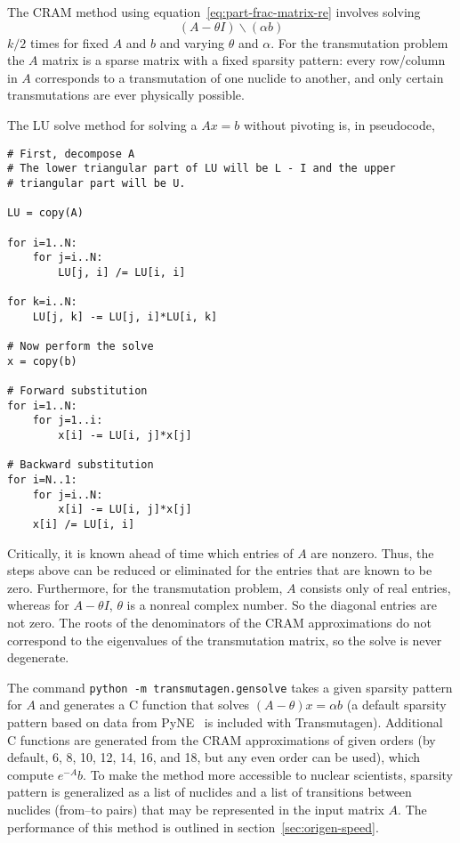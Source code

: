 The CRAM method using equation~\ref{eq:part-frac-matrix-re} involves solving
\begin{equation}
 (A - \theta I)\backslash(\alpha b)
\end{equation}
$k/2$ times for fixed $A$ and $b$ and varying $\theta$ and $\alpha$. For the
transmutation problem the $A$ matrix is a sparse matrix with a fixed sparsity
pattern: every row/column in $A$ corresponds to a transmutation of one nuclide
to another, and only certain transmutations are ever physically possible.

The LU solve method for solving a $Ax=b$ without pivoting is, in pseudocode,

\begin{verbatim}
# First, decompose A
# The lower triangular part of LU will be L - I and the upper
# triangular part will be U.

LU = copy(A)

for i=1..N:
    for j=i..N:
        LU[j, i] /= LU[i, i]

for k=i..N:
    LU[j, k] -= LU[j, i]*LU[i, k]

# Now perform the solve
x = copy(b)

# Forward substitution
for i=1..N:
    for j=1..i:
        x[i] -= LU[i, j]*x[j]

# Backward substitution
for i=N..1:
    for j=i..N:
        x[i] -= LU[i, j]*x[j]
    x[i] /= LU[i, i]
\end{verbatim}

Critically, it is known ahead of time which entries of $A$ are nonzero. Thus,
the steps above can be reduced or eliminated for the entries that are known to
be zero. Furthermore, for the transmutation problem, $A$ consists only of real
entries, whereas for $A - \theta I$, $\theta$ is a nonreal complex number. So
the diagonal entries are not zero. The roots of the denominators of the CRAM
approximations do not correspond to the eigenvalues of the transmutation
matrix, so the solve is never degenerate.

The command \texttt{python -m transmutagen.gensolve} takes a given sparsity
pattern for $A$ and generates a C function that solves
$(A - \theta)x =\alpha b$ (a default sparsity pattern based on data from
PyNE~\cite{ationneeded} is included with Transmutagen). Additional C functions
are generated from the CRAM approximations of given orders (by default, 6, 8,
10, 12, 14, 16, and 18, but any even order can be used), which compute
$e^{-A}b$. To make the method more accessible to nuclear scientists, sparsity
pattern is generalized as a list of nuclides and a list of transitions between
nuclides (from--to pairs) that may be represented in the input matrix $A$. The
performance of this method is outlined in section~\ref{sec:origen-speed}.
